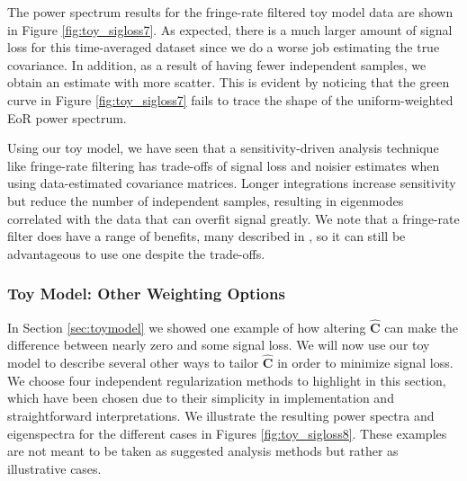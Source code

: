 \documentclass[preprint2,numberedappendix,tighten]{aastex6}  %
\begin{document}
The power spectrum results for the fringe-rate filtered toy model data are shown in Figure \ref{fig:toy_sigloss7}. As 
expected, there is a much larger amount of signal loss for this time-averaged dataset since we do a worse job estimating the true covariance. In addition, as a result of having fewer independent samples, we obtain an estimate with more scatter. This is evident by noticing that the 
green curve in Figure \ref{fig:toy_sigloss7} fails to trace the shape of the uniform-weighted EoR power spectrum.

Using our toy model, we have seen that a sensitivity-driven analysis technique like fringe-rate filtering has trade-offs of signal 
loss and noisier estimates when using data-estimated covariance matrices. Longer integrations increase sensitivity but reduce 
the number of independent samples, resulting in 
eigenmodes correlated with the data
that can overfit signal greatly. We 
note that a fringe-rate filter does have a range of benefits, many described in \citet{parsons_et_al2016}, so it can still be 
advantageous to use one despite the trade-offs.

\subsubsection{Toy Model: Other Weighting Options}
\label{sec:otherweight}

In Section \ref{sec:toymodel} we showed one example of how altering $\widehat{\textbf{C}}$ can 
make the difference between nearly zero and some signal loss. We will now use our toy model to describe several other ways to tailor $\widehat{\textbf{C}}$ 
in order to minimize signal loss. We choose four independent regularization methods to highlight in this section, which have 
been chosen due to their simplicity in implementation and straightforward interpretations. We illustrate the resulting power 
spectra and eigenspectra for the different cases in Figures \ref{fig:toy_sigloss8}.
These examples are not meant to be taken as suggested analysis methods but rather as illustrative cases. 
\end{document}
